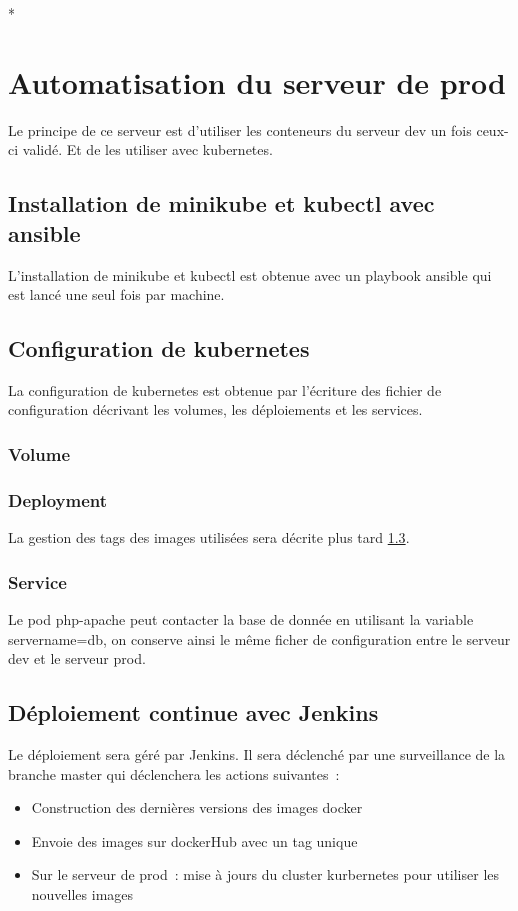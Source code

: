 ﻿*\section{Automatisation du serveur de prod}
Le principe de ce serveur est d'utiliser les conteneurs du serveur dev un fois ceux-ci validé.
Et de les utiliser avec kubernetes.

\subsection{Installation de minikube et kubectl avec ansible}
L'installation de minikube et kubectl est obtenue avec  un playbook ansible qui est lancé une seul fois par machine.



\subsection{Configuration de kubernetes}
La configuration de kubernetes est obtenue par l'écriture des fichier de configuration décrivant les volumes, les déploiements et les services.

\subsubsection{Volume}



\subsubsection{Deployment}
La gestion des tags des images utilisées sera décrite plus tard \ref{prod_jenkins}.


\subsubsection{Service}
Le pod php-apache peut contacter la base de donnée en utilisant la variable servername=db,
on conserve ainsi le même ficher de configuration entre le serveur dev et le serveur prod.





\subsection{Déploiement continue avec Jenkins}
\label{prod_jenkins}
Le déploiement sera géré par Jenkins.
Il sera déclenché par une surveillance de la branche master qui déclenchera les actions suivantes~:
\begin{itemize}
\item Construction des dernières versions des images docker
\item Envoie des images sur dockerHub avec un tag unique
\item Sur le serveur de prod~: mise à jours du cluster kurbernetes pour utiliser les nouvelles images
\end{itemize}

